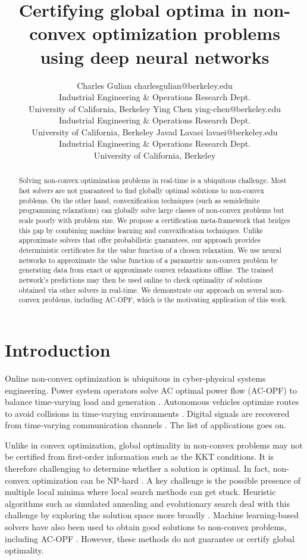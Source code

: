 \documentclass[10pt]{article} %
\title{
Certifying global optima in non-convex optimization problems using deep neural networks
}
\author{\name Charles Gulian \email charlesgulian@berkeley.edu \\
      \addr Industrial Engineering \& Operations Research Dept.\\
      University of California, Berkeley
      \AND
      \name Ying Chen \email ying-chen@berkeley.edu \\
      \addr Industrial Engineering \& Operations Research Dept.\\
      University of California, Berkeley
      \AND
      \name Javad Lavaei \email lavaei@berkeley.edu\\
      \addr Industrial Engineering \& Operations Research Dept.\\
      University of California, Berkeley}
\theoremstyle{plain}
\theoremstyle{definition}
\theoremstyle{remark}
\begin{document}
\maketitle


\begin{abstract}
Solving non-convex optimization problems in real-time is a ubiquitous challenge. Most fast solvers are not guaranteed to find globally optimal solutions to non-convex problems. On the other hand, convexification techniques {(such as semidefinite programming relaxations)} can globally solve large classes of non-convex problems but scale poorly with problem size. We propose {a certification meta-framework that bridges this gap by combining} machine learning and convexification techniques. {Unlike approximate solvers that offer probabilistic guarantees, our approach provides deterministic certificates for the value function of a chosen relaxation.} We use neural networks to approximate the value function of a parametric non-convex problem by generating data from exact or approximate convex relaxations offline. The trained network's predictions may then be used {online} to check optimality of solutions obtained via other solvers in real-time. We demonstrate our approach on several non-convex problems, including AC-OPF, which is the motivating application of this work.
\end{abstract}

\section{Introduction}

Online non-convex optimization is ubiquitous in cyber-physical systems engineering.
Power system operators solve AC optimal power flow (AC-OPF) to balance time-varying load and generation \citep{van2021machine}. Autonomous vehicles optimize routes to avoid collisions in time-varying environments \citep{ahmadi2016some}. Digital signals are recovered from time-varying communication channels \citep{samuel2017deep}. The list of applications goes on.

Unlike in convex optimization, global optimality in non-convex problems may not be certified from first-order information such as the KKT conditions. It is therefore challenging to determine whether a solution is optimal. In fact, non-convex optimization can be NP-hard \citep{murty1985some}. A key challenge is the possible presence of multiple local minima where local search methods can get stuck. Heuristic algorithms such as simulated annealing and evolutionary search deal with this challenge by exploring the solution space more broadly \citep{dauphin2014identifying, kumar2020test}. Machine learning-based solvers have also been used to obtain good solutions to non-convex problems, including AC-OPF \citep{jiang2024advancements}. However, these methods do not guarantee or certify global optimality. 
\end{document}
